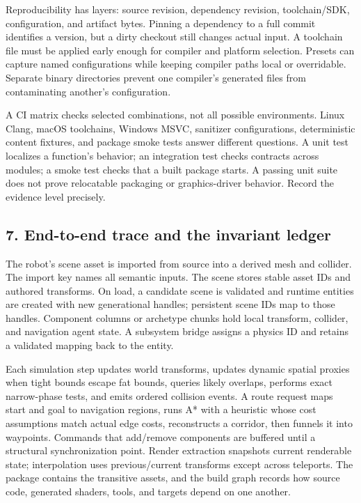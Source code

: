 Reproducibility has layers: source revision, dependency revision, toolchain/SDK, configuration, and artifact bytes. Pinning a dependency to a full commit identifies a version, but a dirty checkout still changes actual input. A toolchain file must be applied early enough for compiler and platform selection. Presets can capture named configurations while keeping compiler paths local or overridable. Separate binary directories prevent one compiler's generated files from contaminating another's configuration.

A CI matrix checks selected combinations, not all possible environments. Linux Clang, macOS toolchains, Windows MSVC, sanitizer configurations, deterministic content fixtures, and package smoke tests answer different questions. A unit test localizes a function's behavior; an integration test checks contracts across modules; a smoke test checks that a built package starts. A passing unit suite does not prove relocatable packaging or graphics-driver behavior. Record the evidence level precisely.

\subsection{7. End-to-end trace and the invariant ledger}\label{05-engine-i-ch008-end-to-end-trace-and-the-invariant-ledger}

The robot's scene asset is imported from source into a derived mesh and collider. The import key names all semantic inputs. The scene stores stable asset IDs and authored transforms. On load, a candidate scene is validated and runtime entities are created with new generational handles; persistent scene IDs map to those handles. Component columns or archetype chunks hold local transform, collider, and navigation agent state. A subsystem bridge assigns a physics ID and retains a validated mapping back to the entity.

Each simulation step updates world transforms, updates dynamic spatial proxies when tight bounds escape fat bounds, queries likely overlaps, performs exact narrow-phase tests, and emits ordered collision events. A route request maps start and goal to navigation regions, runs A* with a heuristic whose cost assumptions match actual edge costs, reconstructs a corridor, then funnels it into waypoints. Commands that add/remove components are buffered until a structural synchronization point. Render extraction snapshots current renderable state; interpolation uses previous/current transforms except across teleports. The package contains the transitive assets, and the build graph records how source code, generated shaders, tools, and targets depend on one another.

